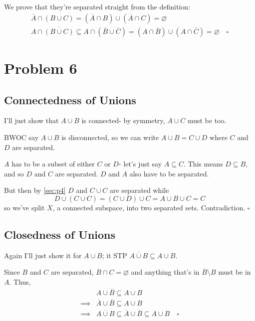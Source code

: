 \documentclass[12pt]{article}
\begin{document}
We prove that they're separated straight from the definition:
\begin{gather*}
  \overline{A} \cap (B \cup C) = \left(\overline{A} \cap B\right) \cup \left(\overline{A} \cap C\right) = \varnothing \\
  A \cap \overline{(B \cup C)} \subseteq A \cap \left(\overline{B} \cup \overline{C}\right) = \left(A \cap \overline{B}\right) \cup \left(A \cap \overline{C}\right) = \varnothing
  \quad\square
\end{gather*}

\pagebreak

\section{Problem 6}

\subsection{Connectedness of Unions}

I'll just show that $A \cup B$ is connected- by symmetry, $A \cup C$ must be too.

BWOC say $A \cup B$ is disconnected, so we can write $A \cup B = C \cup D$ where $C$ and $D$ are separated.

$A$ has to be a subset of either $C$ or $D$- let's just say $A \subseteq C$.
This means $D \subseteq B$, and so $D$ and $C$ are separated.
$D$ and $A$ also have to be separated.

But then by \ref{sec:p4} $D$ and $C \cup C$ are separated while
\[D \cup (C \cup C)=(C \cup D) \cup C = A \cup B \cup C = C\]
so we've split $X$, a connected subspace, into two separated sets.
Contradiction. $\square$

\subsection{Closedness of Unions}

Again I'll just show it for $A \cup B$; it STP $\overline{A \cup B} \subseteq A \cup B$.

Since $B$ and $C$ are separated, $\overline{B} \cap C = \varnothing$
and anything that's in $\overline{B} \setminus B$ must be in $A$.
Thus,
\begin{align*}
  & A \cup \overline{B} \subseteq A \cup B \\
  \implies{} & \overline{A} \cup \overline{B} \subseteq A \cup B \\
  \implies{} & \overline{A \cup B} \subseteq \overline{A} \cup \overline{B} \subseteq A \cup B\quad\square
\end{align*}
\end{document}
